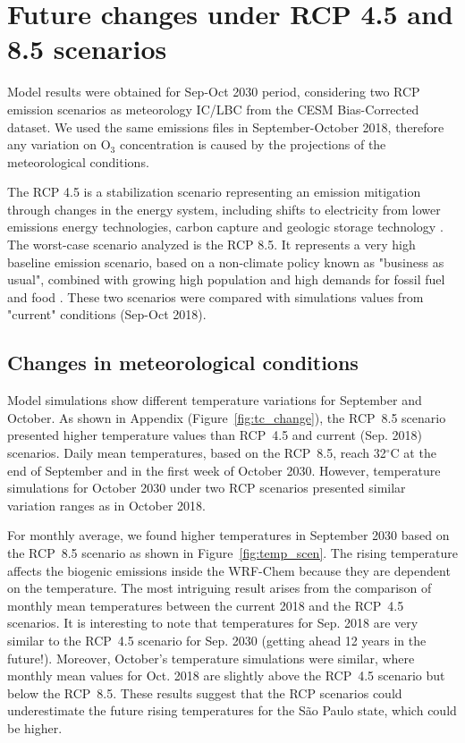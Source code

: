 \section{Future changes under RCP 4.5 and 8.5 scenarios} \label{sec:res_fut}
Model results were obtained for Sep-Oct 2030 period, considering two RCP emission scenarios as meteorology IC/LBC from the CESM Bias-Corrected dataset. We used the same emissions files in September-October 2018, therefore any variation on O$_3$ concentration is caused by the projections of the meteorological conditions.

The RCP 4.5 is a stabilization scenario representing an emission mitigation through changes in the energy system, including shifts to electricity from lower emissions energy technologies, carbon capture and geologic storage technology \citep{Thomson2011}.
The worst-case scenario analyzed is the RCP 8.5.
It represents a very high baseline emission scenario, based on a non-climate policy known as "business as usual", combined with growing high population and high demands for fossil fuel and food \citep{Riahi2011}.
These two scenarios were compared with simulations values from "current" conditions (Sep-Oct 2018).

\subsection{Changes in meteorological conditions}\label{subsec:res_chan_met}
Model simulations show different temperature variations for September and October.
As shown in Appendix (Figure~\ref{fig:tc_change}), the RCP~8.5 scenario presented higher temperature values than RCP~4.5 and current (Sep. 2018) scenarios.
Daily mean temperatures, based on the RCP~8.5, reach 32$^\circ$C at the end of September and in the first week of October 2030.
However, temperature simulations for October 2030 under two RCP scenarios presented similar variation ranges as in October 2018.

For monthly average, we found higher temperatures in September 2030 based on the RCP~8.5 scenario as shown in Figure~\ref{fig:temp_scen}.
The rising temperature affects the biogenic emissions inside the WRF-Chem because they are dependent on the temperature.
The most intriguing result arises from the comparison of monthly mean temperatures between the current 2018 and the RCP~4.5 scenarios.
It is interesting to note that temperatures for Sep. 2018 are very similar to the RCP~4.5 scenario for Sep. 2030 (getting ahead 12 years in the future!).
Moreover, October's temperature simulations were similar, where monthly mean values for Oct. 2018 are slightly above the RCP~4.5 scenario but below the RCP~8.5.
These results suggest that the RCP scenarios could underestimate the future rising temperatures for the S\~{a}o Paulo state, which could be higher.

